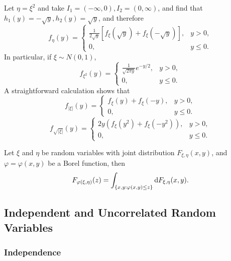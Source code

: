 \begin{example}
Let $\eta = \xi^2$ and take $I_1 = (-\infty, 0), I_2 = (0, \infty)$, and find that $h_1(y) = -\sqrt{y}, h_2(y) = \sqrt{y}$, and therefore
\begin{equation}
    f_\eta(y) = 
    \begin{cases}
     \frac{1}{2\sqrt{y}}[f_\xi(\sqrt{y}) + f_\xi(-\sqrt{y})], & y>0,\\
     0, & y\le 0.
    \end{cases}
\end{equation}
In particular, if $\xi \sim N(0,1)$,
\begin{equation}
    f_{\xi^2}(y) = 
    \begin{cases}
     \frac{1}{\sqrt{2\pi y}}e^{-y/2}, & y>0,\\
     0, & y\le 0.
    \end{cases}
\end{equation}
A straightforward calculation shows that
\begin{equation}
    f_{|\xi|}(y) = 
    \begin{cases}
     f_\xi(y) + f_\xi(-y), & y>0,\\
     0, & y\le 0.
    \end{cases}
\end{equation}
\begin{equation}
    f_{\sqrt{|\xi|}}(y) = 
    \begin{cases}
     2y(f_\xi(y^2) + f_\xi(-y^2)), & y>0,\\
     0, & y\le 0.
    \end{cases}
\end{equation}
\end{example}
Let $\xi$ and $\eta$ be random variables with joint distribution $F_{\xi, \eta}(x,y)$, and $\varphi = \varphi(x,y)$ be a Borel function, then 
\begin{equation}
    F_{\varphi(\xi, \eta)} (z) = \int_{\{ x,y: \varphi(x,y) \le z \}} \mathrm{d} F_{\xi,\eta}(x,y).
\end{equation}


\subsection{Independent and Uncorrelated Random Variables}
\subsubsection{Independence}


